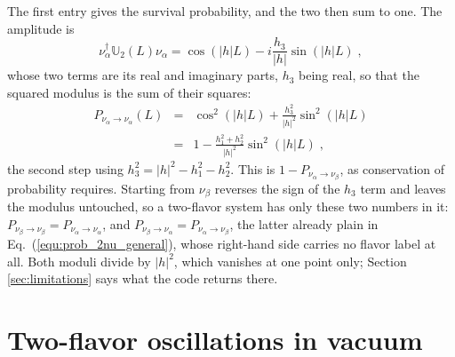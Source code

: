 \documentclass[final,5p,times,twocolumn,sort,compress]{elsarticle}
\newcommand{\eq}{Eq.}
\newcommand{\equ}[1]{\eq~(\ref{equ:#1})}
\begin{document}
The first entry gives the survival probability, and the two then sum to one.  The amplitude is
\begin{equation}
 \nu_\alpha^\dagger \mathbb{U}_2(L) \nu_\alpha
 =
 \cos\left(\left\vert h\right\vert L\right)
 -
 i \frac{h_3}{\lvert h \rvert} \sin\left(\left\vert h\right\vert L\right) \;,
\end{equation}
whose two terms are its real and imaginary parts, $h_3$ being real, so that the squared modulus is the sum of their squares:
\begin{eqnarray}
 P_{\nu_\alpha \to \nu_\alpha}(L)
 \!\!\!&=&\!\!\!
 \cos^2(\lvert h \rvert L)
 +
 \frac{h_3^2}{\lvert h \rvert^2} \sin^2(\lvert h \rvert L) \nonumber \\
 \!\!\!&=&\!\!\!
 1 - \frac{h_1^2 + h_2^2}{\lvert h \rvert^2} \sin^2(\lvert h \rvert L) \;,
\end{eqnarray}
the second step using $h_3^2 = \lvert h \rvert^2 - h_1^2 - h_2^2$.  This is $1 - P_{\nu_\alpha \to \nu_\beta}$, as conservation of probability requires.  Starting from $\nu_\beta$ reverses the sign of the $h_3$ term and leaves the modulus untouched, so a two-flavor system has only these two numbers in it: $P_{\nu_\beta \to \nu_\beta} = P_{\nu_\alpha \to \nu_\alpha}$, and $P_{\nu_\beta \to \nu_\alpha} = P_{\nu_\alpha \to \nu_\beta}$, the latter already plain in \equ{prob_2nu_general}, whose right-hand side carries no flavor label at all.  Both moduli divide by $\lvert h \rvert^2$, which vanishes at one point only; Section \ref{sec:limitations} says what the code returns there.


\section{Two-flavor oscillations in vacuum}
\label{app:2nu_vacuum}
\appresetfloats
\end{document}
